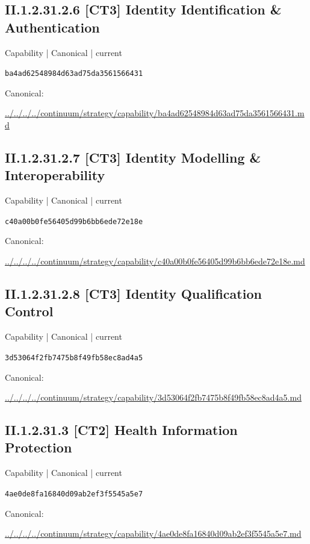 \documentclass[10pt,a4paper]{article}
\begin{document}
\subsection*{II.1.2.31.2.6 [CT3] Identity Identification \& Authentication}
{\small Capability | Canonical | current}\par
\texttt{ba4ad62548984d63ad75da3561566431}\par
Canonical: \par
{\footnotesize\url{../../../../continuum/strategy/capability/ba4ad62548984d63ad75da3561566431.md}}\par
\subsection*{II.1.2.31.2.7 [CT3] Identity Modelling \& Interoperability}
{\small Capability | Canonical | current}\par
\texttt{c40a00b0fe56405d99b6bb6ede72e18e}\par
Canonical: \par
{\footnotesize\url{../../../../continuum/strategy/capability/c40a00b0fe56405d99b6bb6ede72e18e.md}}\par
\subsection*{II.1.2.31.2.8 [CT3] Identity Qualification Control}
{\small Capability | Canonical | current}\par
\texttt{3d53064f2fb7475b8f49fb58ec8ad4a5}\par
Canonical: \par
{\footnotesize\url{../../../../continuum/strategy/capability/3d53064f2fb7475b8f49fb58ec8ad4a5.md}}\par
\subsection*{II.1.2.31.3 [CT2] Health Information Protection}
{\small Capability | Canonical | current}\par
\texttt{4ae0de8fa16840d09ab2ef3f5545a5e7}\par
Canonical: \par
{\footnotesize\url{../../../../continuum/strategy/capability/4ae0de8fa16840d09ab2ef3f5545a5e7.md}}\par
\end{document}
